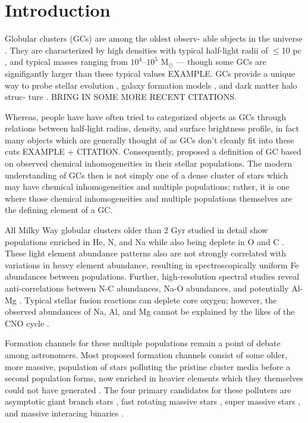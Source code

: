 \section{Introduction}\label{sec:Intro}
Globular clusters (GCs) are among the oldest observ- able objects in the
universe \citep{Pen11}. They are characterized by high densities with typical
half-light radii of $\le$10 pc \citep{Vanderburg2010}, and typical masses
ranging from $10^{4}$--$10^{5}$ M$_{\odot}$ \citep{Bro06} --- though some GCs
are signifigantly larger than these typical values {\color{red}EXAMPLE}. GCs
provide a unique way to probe stellar evolution \citep{Bau03}, galaxy formation
models \citep{Boy18,Kra05}, and dark matter halo struc- ture \citep{Hud18}.
{\color{red} BRING IN SOME MORE RECENT CITATIONS.}

Whereas, people have have often tried to categorized objects as GCs through
relations between half-light radius, density, and surface brightness profile,
in fact many objects which are generally thought of as GCs don't cleanly fit
into these cuts {\color{red} EXAMPLE + CITATION}. Consequently,
\citet{Carretta2010} proposed a definition of GC based on observed chemical
inhomogeneities in their stellar populations. The modern understanding of GCs
then is not simply one of a dense cluster of stars which may have chemical
inhomogeneities and multiple populations; rather, it is one where those
chemical inhomogeneities and multiple populations themselves are the defining
element of a GC.

All Milky Way globular clusters older than 2 Gyr studied in detail show
populations enriched in He, N, and Na while also being deplete in O and C
\citep{Piotto2015,Bastian2018}. These light element abundance patterns also are
not strongly correlated with variations in heavy element abundance, resulting
in spectroscopically uniform Fe abundances between populations. Further,
high-resolution spectral studies reveal anti-correlations between N-C
abundances, Na-O abundances, and potentially Al-Mg \citep{Sneden1992,
Gratton2012}. Typical stellar fusion reactions can deplete core oxygen;
however, the observed abundances of Na, Al, and Mg cannot be explained by the
likes of the CNO cycle \citep{Prantzos2007}.

Formation channels for these multiple populations remain a point of debate
among astronomers. Most proposed formation channels consist of some older,
more massive, population of stars polluting the pristine cluster media before a
second population forms, now enriched in heavier elements which they themselves could
not have generated \citep[for a detailed review see ][]{Gratton2012}. The four
primary candidates for these polluters are asymptotic giant branch stars
\citep[AGBs,][]{Ventura2001,DErcole2010}, fast rotating massive stars
\citep[FRMSs,][]{Decressin2007}, super massive stars
\citep[SMSs,][]{Denissenkov2014}, and massive interacing binaries
\citep[MIBs,][]{deMink2009, Bastian2018}. 

